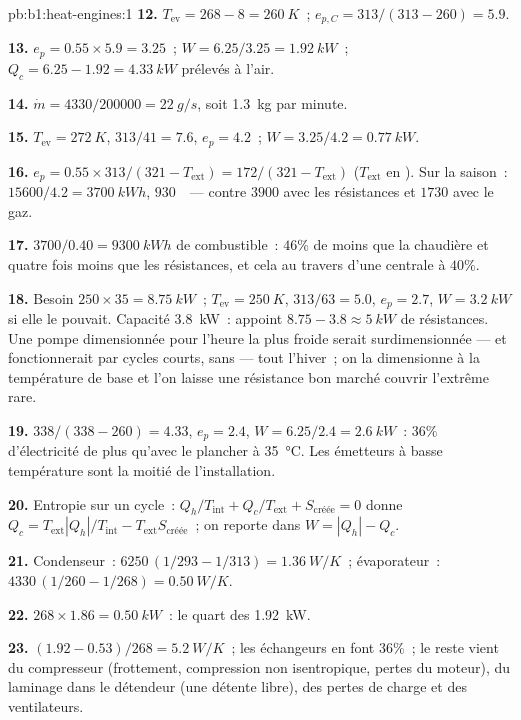 \begin{solution}{pb:b1:heat-engines:1}
\textbf{12.} $T_{\mathrm{ev}} = 268 - 8 = \qty{260}{K}$~; $e_{p,C} = 313/(313 - 260)
= 5.9$.

\textbf{13.} $e_p = 0.55 \times 5.9 = 3.25$~; $W = 6.25/3.25 = \qty{1.92}{kW}$~;
$Q_c = 6.25 - 1.92 = \qty{4.33}{kW}$ prélevés à l'air.

\textbf{14.} $\dot m = 4330/200000 = \qty{22}{g/s}$, soit \qty{1.3}{kg} par minute.

\textbf{15.} $T_{\mathrm{ev}} = \qty{272}{K}$, $313/41 = 7.6$, $e_p = 4.2$~;
$W = 3.25/4.2 = \qty{0.77}{kW}$.

\textbf{16.} $e_p = 0.55 \times 313/(321 - T_{\mathrm{ext}}) = 172/(321 -
T_{\mathrm{ext}})$ ($T_{\mathrm{ext}}$ en ). Sur la saison~: $15600/4.2 =
\qty{3700}{kW h}$, $930$~\texteuro\ --- contre $3900$ avec les résistances et
$1730$ avec le gaz.

\textbf{17.} $3700/0.40 = \qty{9300}{kW h}$ de combustible~: $46\%$ de moins que
la chaudière et quatre fois moins que les résistances, et cela au travers d'une
centrale à $40\%$.

\textbf{18.} Besoin $250 \times 35 = \qty{8.75}{kW}$~; $T_{\mathrm{ev}} = \qty{250}{K}$,
$313/63 = 5.0$, $e_p = 2.7$, $W = \qty{3.2}{kW}$ si elle le pouvait. Capacité
\qty{3.8}{kW}~: appoint $8.75 - 3.8 \approx \qty{5}{kW}$ de résistances. Une pompe
dimensionnée pour l'heure la plus froide serait surdimensionnée --- et
fonctionnerait par cycles courts, sans  --- tout l'hiver~; on la
dimensionne à la température de base et l'on laisse une résistance bon marché
couvrir l'extrême rare.

\textbf{19.} $338/(338 - 260) = 4.33$, $e_p = 2.4$, $W = 6.25/2.4 =
\qty{2.6}{kW}$~: $36\%$ d'électricité de plus qu'avec le plancher à
\qty{35}{\degreeCelsius}. Les émetteurs à basse température sont la moitié de
l'installation.

\textbf{20.} Entropie sur un cycle~: $Q_h/T_{\mathrm{int}} + Q_c/T_{\mathrm{ext}} +
S_{\text{créée}} = 0$ donne $Q_c = T_{\mathrm{ext}}|Q_h|/T_{\mathrm{int}} -
T_{\mathrm{ext}}S_{\text{créée}}$~; on reporte dans $W = |Q_h| - Q_c$.

\textbf{21.} Condenseur~: $6250\,(1/293 - 1/313) = \qty{1.36}{W/K}$~; évaporateur~:
$4330\,(1/260 - 1/268) = \qty{0.50}{W/K}$.

\textbf{22.} $268 \times 1.86 = \qty{0.50}{kW}$~: le quart des
\qty{1.92}{kW}.

\textbf{23.} $(1.92 - 0.53)/268 = \qty{5.2}{W/K}$~; les échangeurs en font
$36\%$~; le reste vient du compresseur (frottement, compression non
isentropique, pertes du moteur), du laminage dans le détendeur (une détente
libre), des pertes de charge et des ventilateurs.


\end{solution}

